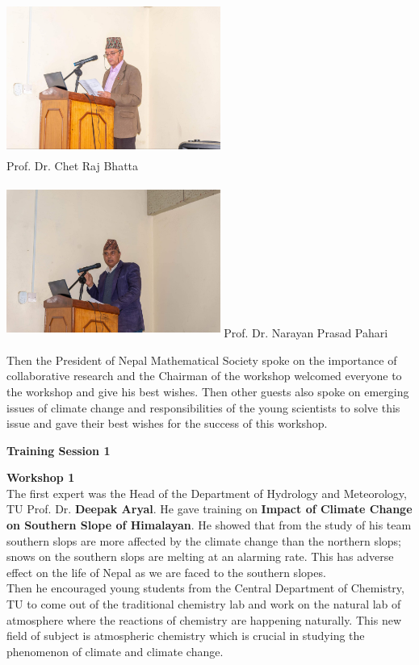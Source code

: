 \documentclass[a4paper,12pt]{report}
\begin{document}
\vspace{3mm}
\begin{multicols}{2}
  \includegraphics[width=7cm, height=5cm]{chet.jpeg}\\
  \hspace*{5mm}Prof. Dr. Chet Raj Bhatta

  \columnbreak
  \includegraphics[width=7cm, height=5cm]{np.jpeg}
  \hspace*{3mm} Prof. Dr. Narayan Prasad Pahari
\end{multicols}

\vspace*{5mm}
\noindent
Then the President of Nepal Mathematical Society spoke on the importance of collaborative research and the Chairman of the workshop welcomed everyone to the workshop and give his best wishes. Then other guests also spoke on emerging issues of climate change and responsibilities of the young scientists to solve this issue and gave their best wishes for the success of this workshop.
\clearpage

\begin{center}
  {\bfseries \Large Training Session 1}
\end{center}
\vspace{3mm}

{\bfseries \large Workshop 1}\\[3mm]
The first expert was the Head of the Department of Hydrology and Meteorology, TU Prof. Dr. \textbf{Deepak Aryal}. He gave training on \textbf{Impact of Climate Change on Southern Slope of Himalayan}. He showed that from the study of his team southern slops are more affected by the climate change than the northern slops; snows on the southern slops are melting at an alarming rate. This has adverse effect on the life of Nepal as we are faced to the southern slopes.\\
Then he encouraged young students from the Central Department of Chemistry, TU to come out of the traditional chemistry lab and work on the natural lab of atmosphere where the reactions of chemistry are happening naturally. This new field of subject is atmospheric chemistry which is crucial in studying the phenomenon of climate and climate change.
\vspace{3mm}
\end{document}
